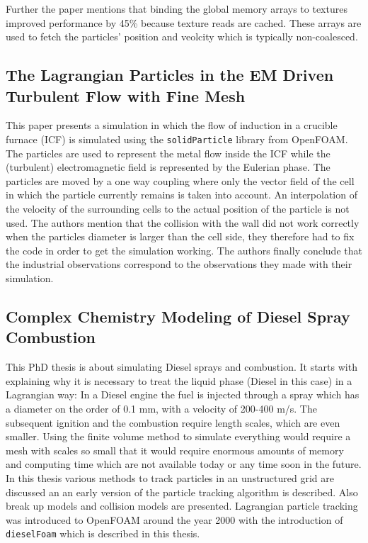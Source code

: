 Further the paper mentions that binding the global memory arrays to textures improved performance by 45\% because texture reads are cached. These arrays are used to fetch the particles' position and veolcity which is typically non-coalesced.

\subsection{The Lagrangian Particles in the EM Driven Turbulent Flow with Fine Mesh}
This paper \cite{solidParticle11} presents a simulation in which the flow of induction in a crucible furnace (ICF) is simulated using the \verb+solidParticle+ library from OpenFOAM. The particles are used to represent the metal flow inside the ICF while the (turbulent) electromagnetic field is represented by the Eulerian phase. The particles are moved by a one way coupling where only the vector field of the cell in which the particle currently remains is taken into account. An interpolation of the velocity of the surrounding cells to the actual position of the particle is not used. The authors mention that the collision with the wall did not work correctly when the particles diameter is larger than the cell side, they therefore had to fix the code in order to get the simulation working. The authors finally conclude that the industrial observations correspond to the observations they made with their simulation.


\subsection{Complex Chemistry Modeling of Diesel Spray Combustion}

This PhD thesis \cite{nordin00} is about simulating Diesel sprays and combustion. It starts with explaining why it is necessary to treat the liquid phase (Diesel in this case) in a Lagrangian way: In a Diesel engine the fuel is injected through a spray which has a diameter on the order of 0.1 mm, with a velocity of 200-400 m/s. The subsequent ignition and the combustion require length scales, which are even smaller. Using the finite volume method to simulate everything would require a mesh with scales so small that it would require enormous amounts of memory and computing time which are not available today or any time soon in the future. In this thesis various methods to track particles in an unstructured grid are discussed an an early  version of the particle tracking algorithm \cite{macpherson08} is described. Also break up models and collision models are presented. Lagrangian particle tracking was introduced to OpenFOAM around the year 2000 with the introduction of \verb+dieselFoam+ which is described in this thesis.

